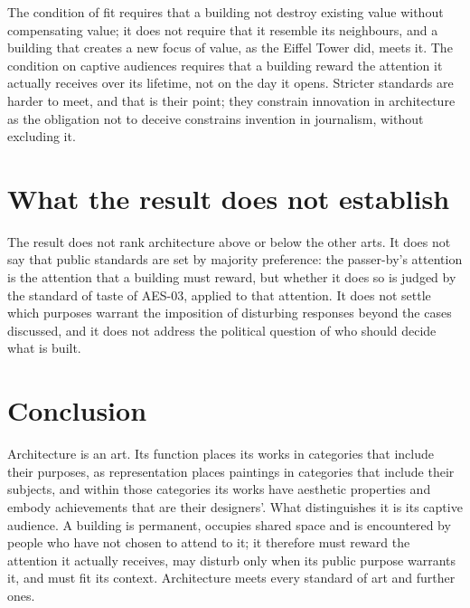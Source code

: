 \documentclass{situationist-preprint}
\begin{document}
\begin{reply}
The condition of fit requires that a building not destroy existing value without compensating value; it does not require that it resemble its neighbours, and a building that creates a new focus of value, as the Eiffel Tower did, meets it. The condition on captive audiences requires that a building reward the attention it actually receives over its lifetime, not on the day it opens. Stricter standards are harder to meet, and that is their point; they constrain innovation in architecture as the obligation not to deceive constrains invention in journalism, without excluding it.
\end{reply}

\section{What the result does not establish}

The result does not rank architecture above or below the other arts. It does not say that public standards are set by majority preference: the passer-by's attention is the attention that a building must reward, but whether it does so is judged by the standard of taste of AES-03, applied to that attention. It does not settle which purposes warrant the imposition of disturbing responses beyond the cases discussed, and it does not address the political question of who should decide what is built.

\section{Conclusion}

Architecture is an art. Its function places its works in categories that include their purposes, as representation places paintings in categories that include their subjects, and within those categories its works have aesthetic properties and embody achievements that are their designers'. What distinguishes it is its captive audience. A building is permanent, occupies shared space and is encountered by people who have not chosen to attend to it; it therefore must reward the attention it actually receives, may disturb only when its public purpose warrants it, and must fit its context. Architecture meets every standard of art and further ones.
\end{document}
